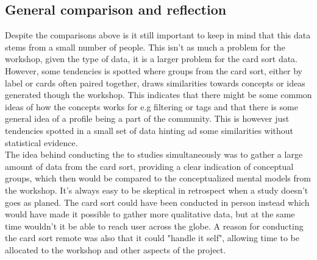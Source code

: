\subsection*{General comparison and reflection}
\label{CompareGeneral}
Despite the comparisons above is it still important to keep in mind that this data stems from a small number of people. This isn't as much a problem for the workshop, given the type of data, it is a larger problem for the card sort data. However, some tendencies is spotted where groups from the card sort, either by label or cards often paired together, draws similarities towards concepts or ideas generated though the workshop. This indicates that there might be some common ideas of how the concepts works for e.g filtering or tags and that there is some general idea of a profile being a part of the community. This is however just tendencies spotted in a small set of data hinting ad some similarities without statistical evidence. \\
The idea behind conducting the to studies simultaneously was to gather a large amount of data from the card sort, providing a clear indication of conceptual groups, which then would be compared to the conceptualized mental models from the workshop. It's always easy to be skeptical in retrospect when a study doesn't goes as planed. The card sort could have been conducted in person instead which would have made it possible to gather more qualitative data, but at the same time wouldn't it be able to reach user across the globe. A reason for conducting the card sort remote was also that it could "handle it self", allowing time to be allocated to the workshop and other aspects of the project.\\
